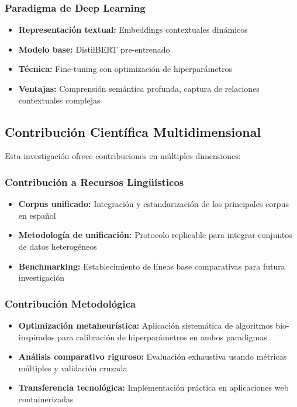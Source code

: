 \subsubsection{Paradigma de Deep Learning}
\begin{itemize}
    \item \textbf{Representación textual:} Embeddings contextuales dinámicos
    \item \textbf{Modelo base:} DistilBERT pre-entrenado \cite{sanh2019distilbert}
    \item \textbf{Técnica:} Fine-tuning con optimización de hiperparámetros
    \item \textbf{Ventajas:} Comprensión semántica profunda, captura de relaciones contextuales complejas
\end{itemize}

\subsection{Contribución Científica Multidimensional}

Esta investigación ofrece contribuciones en múltiples dimensiones:

\subsubsection{Contribución a Recursos Lingüísticos}
\begin{itemize}
    \item \textbf{Corpus unificado:} Integración y estandarización de los principales corpus en español
    \item \textbf{Metodología de unificación:} Protocolo replicable para integrar conjuntos de datos heterogéneos
    \item \textbf{Benchmarking:} Establecimiento de líneas base comparativas para futura investigación
\end{itemize}

\subsubsection{Contribución Metodológica}
\begin{itemize}
    \item \textbf{Optimización metaheurística:} Aplicación sistemática de algoritmos bio-inspirados para calibración de hiperparámetros en ambos paradigmas
    \item \textbf{Análisis comparativo riguroso:} Evaluación exhaustiva usando métricas múltiples y validación cruzada
    \item \textbf{Transferencia tecnológica:} Implementación práctica en aplicaciones web containerizadas
\end{itemize}

